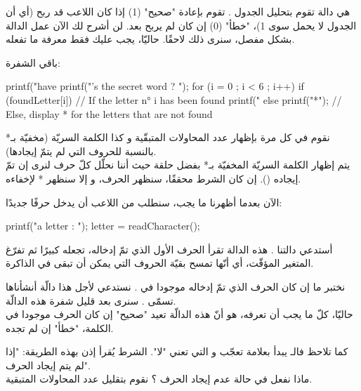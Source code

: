 هي دالة تقوم بتحليل الجدول
.
تقوم بإعادة "صحيح" (1) إذا كان اللاعب قد ربح (أي أن الجدول
لا يحمل سوى 1)، "خطأ" (0) إن كان لم يربح بعد.
لن أشرح لك الآن عمل الدالة بشكل مفصل، سنرى ذلك لاحقًا. حاليّا، يجب عليك فقط معرفة ما تفعله.

باقي الشفرة:

\begin{Csource}
printf("\n\nYou have %
printf("\nWhat's the secret word ? ");
for (i = 0 ; i < 6 ; i++)
{
  if (foundLetter[i]) // If the letter n° i has been found
    printf("%
  else
    printf("*"); // Else, display * for the letters that are not found
}
\end{Csource}

نقوم في كل مرة بإظهار عدد المحاولات المتبقّية و كذا الكلمة السريّة (مخفيّة بـ* بالنسبة للحروف التي لم يتمّ إيجادها).\\
يتم إظهار الكلمة السريّة المخفيّة بـ* بفضل حلقة
حيث أننا نحلّل كلّ حرف لنرى إن تمّ إيجاده
().
إن كان الشرط محققًا، سنظهر الحرف، و إلا سنظهر * لإخفاءه.

الآن بعدما أظهرنا ما يجب، سنطلب من اللاعب أن يدخل حرفًا جديدًا:

\begin{Csource}
printf("\nSuggest a letter : ");
letter = readCharacter();
\end{Csource}

أستدعي دالتنا
.
هذه الدالة تقرأ الحرف الأول الذي تمّ إدخاله، تجعله  كبيرًا ثم تفرّغ المتغير المؤقّت، أي أنّها تمسح بقيّة الحروف التي يمكن أن تبقى في الذاكرة.

\begin{Csource}
// if it's NOT the right letter
if (!findLetter(letter, secretWord, foundLetter))
  {
    remainingTries--; // Decrement the remaining tries
  }
}
\end{Csource}

نختبر ما إن كان الحرف الذي تمّ إدخاله موجودا في
.
نستدعي لأجل هذا دالّة أنشأناها تسمّى
.
سنرى بعد قليل شفرة هذه الدالّة.\\
حاليّا، كلّ ما يجب أن تعرفه، هو أنّ هذه الدالّة تعيد "صحيح" إن كان الحرف موجودا في الكلمة، "خطأ" إن لم تجده.

كما تلاحظ فالـ
يبدأ بعلامة تعجّب
\InlineCode{!}
و التي تعني "لا". الشرط يُقرأ إذن بهذه الطريقة: "إذا لم يتم إيجاد الحرف".\\
ماذا نفعل في حالة عدم إيجاد الحرف ؟ نقوم بتقليل عدد المحاولات المتبقية.

